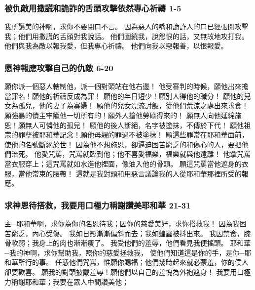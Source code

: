 \subsubsection{被仇敵用撒謊和詭詐的舌頭攻擊依然專心祈禱 1-5}
我所讚美的神啊，求你不要閉口不言。
因為惡人的嘴和詭詐人的口已經張開攻擊我；他們用撒謊的舌頭對我說話。
他們圍繞我，說怨恨的話，又無故地攻打我。
他們與我為敵以報我愛，但我專心祈禱。
他們向我以惡報善，以恨報愛。
\subsubsection{愿神報應攻擊自己的仇敵 6-20}
願你派一個惡人轄制他，派一個對頭站在他右邊！
他受審判的時候，願他出來擔當罪名！願他的祈禱反成為罪！
願他的年日短少！願別人得他的職分！
願他的兒女為孤兒，他的妻子為寡婦！
願他的兒女漂流討飯，從他們荒涼之處出來求食！
願強暴的債主牢籠他一切所有的！願外人搶他勞碌得來的！
願無人向他延綿施恩！願無人可憐他的孤兒！
願他的後人斷絕，名字被塗抹，不傳於下代！
願他祖宗的罪孽被耶和華記念！願他母親的罪過不被塗抹！
願這些罪常在耶和華面前，使他的名號斷絕於世！
因為他不想施恩，卻逼迫困苦窮乏的和傷心的人，要把他們治死。
他愛咒罵，咒罵就臨到他；他不喜愛福樂，福樂就與他遠離！
他拿咒罵當衣服穿上；這咒罵就如水進他裡面，像油入他的骨頭。
願這咒罵當他遮身的衣服，當他常束的腰帶！
這就是我對頭和用惡言議論我的人從耶和華那裡所受的報應。
\subsubsection{求神恩待搭救，我要用口極力稱謝讚美耶和華 21-31}
主─耶和華啊，求你為你的名恩待我；因你的慈愛美好，求你搭救我！
因為我困苦窮乏，內心受傷。
我如日影漸漸偏斜而去；我如蝗蟲被抖出來。
我因禁食，膝骨軟弱；我身上的肉也漸漸瘦了。
我受他們的羞辱，他們看見我便搖頭。
耶和華─我的神啊，求你幫助我，照你的慈愛拯救我，
使他們知道這是你的手，是你─耶和華所行的事。
任憑他們咒罵，惟願你賜福；他們幾時起來就必蒙羞，你的僕人卻要歡喜。
願我的對頭披戴羞辱！願他們以自己的羞愧為外袍遮身！
我要用口極力稱謝耶和華；我要在眾人中間讚美他；


